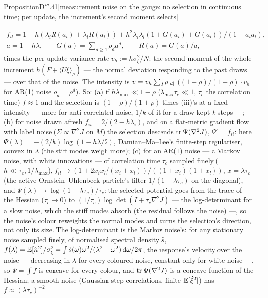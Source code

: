 \begin{thm}{Proposition}{D$'''$.41}[measurement noise on the gauge: no selection in continuous time; per update, the
increment's second moment selects]
\begin{enumerate}[label=\textup{(\roman*)}]
\begin{gather*}
      f_{il} = 1 - h(\lambda_iR(a_i) + \lambda_lR(a_l))
      + h^2\lambda_i\lambda_l(1 + G(a_i) + G(a_l))/(1 - a_ia_l),\\
      a = 1 - h\lambda,\qquad G(a) = \sum_{d\ge1}\rho_da^d,\qquad R(a) = G(a)/a,
    \end{gather*}
    times the per-update variance rate $v_h := h\sigma_\xi^2/N$: the second moment of the whole increment
    $h(F + \langle U\xi\rangle_\rho)$ --- the normal deviation responding to the past draws --- over that of the noise.
    The intensity is $v = v_h\sum_d\rho_{\lvert d\rvert}$ ($(1 + \rho)/(1 - \rho)\cdot v_h$ for AR(1) noise $\rho_d = \rho^d$).
    So: (a) if $h\lambda_{\max}\ll1 - \rho$ ($\lambda_{\max}\tau_c\ll1$, $\tau_c$ the correlation time) $f\approx1$ and
    the selection is $(1 - \rho)/(1 + \rho)$ times (iii)'s at a fixed intensity --- more for anti-correlated noise,
    $1/k$ of it for a draw kept $k$ steps ---; (b) for noise drawn afresh $f_{ii} = 2/(2 - h\lambda_i)$, and on a
    flat-metric gradient flow with label noise ($\Sigma\propto\nabla^2J$ on $M$) the selection descends
    $\operatorname{tr}\Psi(\nabla^2J)$, $\Psi' = f_{ii}$: here $\Psi(\lambda) = -(2/h)\log(1 - h\lambda/2)$, Damian--Ma--Lee's
    finite-step regulariser, convex in $\lambda$ (the stiff modes weigh more); (c) for an AR(1) noise --- a Markov noise,
    with white innovations --- of correlation time $\tau_c$ sampled finely ($h\ll\tau_c,1/\lambda_{\max}$),
    $f_{il}\to(1 + 2x_ix_l/(x_i + x_l))/((1 + x_i)(1 + x_l))$, $x = \lambda\tau_c$ (the active Ornstein--Uhlenbeck
    particle's filter $1/(1 + \lambda\tau_c)$ on the diagonal), and $\Psi(\lambda)\to\log(1 + \lambda\tau_c)/\tau_c$:
    the selected potential goes from the trace of the Hessian ($\tau_c\to0$) to
    $(1/\tau_c)\log\det(I + \tau_c\nabla^2J)$ --- the log-determinant for a slow noise, which the stiff modes absorb
    (the residual follows the noise) ---, so the noise's colour reweights the normal modes and turns the selection's
    direction, not only its size. The log-determinant is the Markov noise's: for any stationary noise sampled finely,
    of normalised spectral density $\hat s$,
    $f(\lambda) = \mathbb{E}[\dot n^2]/\sigma_\xi^2 = \int\hat s(\omega)\omega^2/(\lambda^2 + \omega^2)\,\mathrm{d}\omega/2\pi$, the
    response's velocity over the noise --- decreasing in $\lambda$ for every coloured noise, constant only for white
    noise ---, so $\Psi = \int f$ is concave for every colour, and $\operatorname{tr}\Psi(\nabla^2J)$ is a concave function of the
    Hessian; a smooth noise (Gaussian step correlations, finite $\mathbb{E}[\dot\xi^2]$) has $f\approx(\lambda\tau_c)^{-2}$

\end{enumerate}
\end{thm}
